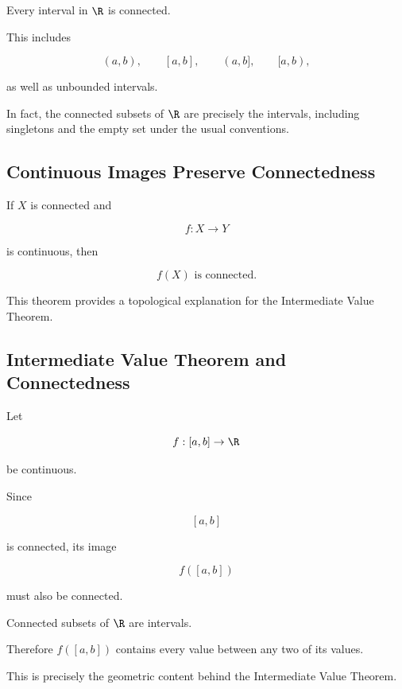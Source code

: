 Every interval in \(\R\) is connected.

This includes

\[
(a,b),
\qquad
[a,b],
\qquad
(a,b],
\qquad
[a,b),
\]

as well as unbounded intervals.

In fact, the connected subsets of \(\R\) are precisely the intervals,
including singletons and the empty set under the usual conventions.

\subsection{Continuous Images Preserve Connectedness}
\label{subsec:continuous-image-connected}

\begin{theorem}
If \(X\) is connected and

\[
f:X\to Y
\]

is continuous, then

\[
\boxed{
f(X)
\text{ is connected}.
}
\]
\end{theorem}

This theorem provides a topological explanation for the Intermediate Value
Theorem.

\subsection{Intermediate Value Theorem and Connectedness}
\label{subsec:ivt-connectedness}

Let

\[
f:[a,b]\to\R
\]

be continuous.

Since

\[
[a,b]
\]

is connected, its image

\[
f([a,b])
\]

must also be connected.

Connected subsets of \(\R\) are intervals.

Therefore \(f([a,b])\) contains every value between any two of its values.

This is precisely the geometric content behind the Intermediate Value
Theorem.

